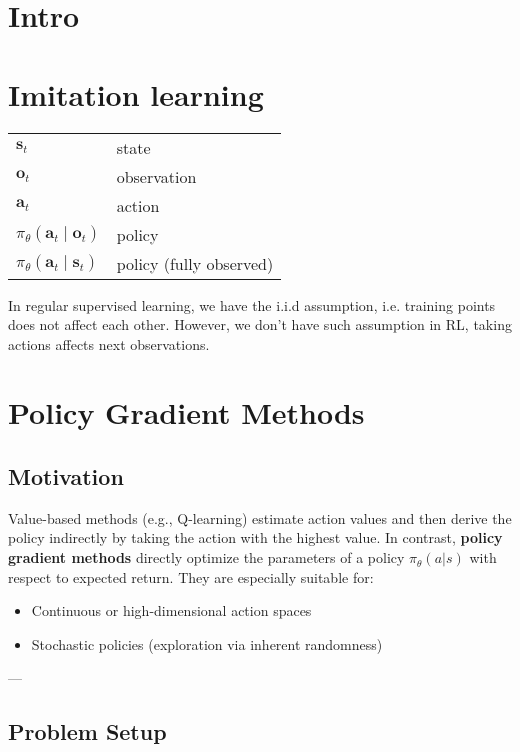 \documentclass[12pt]{article}
\theoremstyle{definition} %
\theoremstyle{plain} %
\theoremstyle{remark} %
\begin{document}
\begin{CJK}{UTF8}{gbsn}

\section{Intro}
\section{Imitation learning}
\begin{flushleft}
\begin{tabular}{ll}
$\mathbf{s}_t$ & state \\
$\mathbf{o}_t$ & observation \\
$\mathbf{a}_t$ & action \\
$\pi_\theta(\mathbf{a}_t \mid \mathbf{o}_t)$ & policy \\
$\pi_\theta(\mathbf{a}_t \mid \mathbf{s}_t)$ & policy (fully observed) \\
\end{tabular}
\end{flushleft}
In regular supervised learning, we have the i.i.d assumption, i.e. training points does not affect each other. However, we don't have such assumption in RL, taking actions affects
next observations.

\section{Policy Gradient Methods}

\subsection{Motivation}

Value-based methods (e.g., Q-learning) estimate action values and then derive the policy indirectly by taking the action with the highest value.  
In contrast, \textbf{policy gradient methods} directly optimize the parameters of a policy
\(\pi_\theta(a|s)\) with respect to expected return.  
They are especially suitable for:
\begin{itemize}
    \item Continuous or high-dimensional action spaces
    \item Stochastic policies (exploration via inherent randomness)
\end{itemize}

---

\subsection{Problem Setup}


\end{CJK}
\end{document}
